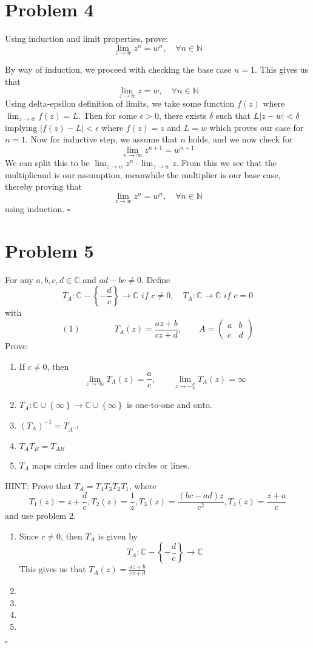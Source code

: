 \documentclass[12pt]{article}
\newcommand{\N}{\mathbb{N}}
\newcommand{\C}{\mathbb{C}}
\newcommand{\set}[1]{\left\{ #1\right\}}
\newenvironment{proof}{\noindent{\bf Proof.}}{\hfill $\square$\medskip}
\begin{document}
\section{Problem 4}
Using induction and limit properties, prove:
$$\lim_{z\to w}z^{n}=w^{n},\quad\forall n\in\N$$

\begin{proof}
By way of induction, we proceed with checking the base case $n=1$. This gives us that
$$\lim_{z\to w}z=w,\quad\forall n\in\N$$
Using delta-epsilon definition of limits, we take some function $f(z)$ where $\lim_{z\to w}f(z)=L$. Then for some $\epsilon>0$, there exists $\delta$ such that $L|z-w|<\delta$ implying $|f(z)-L|<\epsilon$ where $f(z)=z$ and $L=w$ which proves our case for $n=1$. Now for inductive step, we assume that $n$ holds, and we now check for
$$\lim_{n\to\infty}z^{n+1}=w^{n+1}$$
We can split this to be $\lim_{z\to w}z^{n}\cdot \lim_{z\to w}z$. From this we see that the multiplicand is our assumption, meanwhile the multiplier is our base case, thereby proving that
$$\lim_{z\to w}z^{n}=w^{n},\quad\forall n\in\N$$
using induction.
\end{proof}


\newpage
\section{Problem 5}
For any $a,b,c,d\in \C$ and $ad-bc\neq 0$. Define
$$T_{A}:\C-\set{-\frac{d}{c}}\rightarrow\C\textit{ if }c\neq 0,\quad T_{A}:\C\rightarrow\C\textit{ if }c=0$$
with
$$(1)\qquad\qquad T_{A}(z)=\frac{az+b}{cz+d},\qquad A=\begin{pmatrix}a&b\\c&d\end{pmatrix}$$
Prove:
\begin{enumerate}[label=\textbf{(\alph*)}]
    \item If $c\neq 0$, then
    $$\lim_{z\to\infty}T_{A}(z)=\frac{a}{c},\qquad \lim_{z\to-\frac{d}{c}}T_{A}(z)=\infty$$
    \item $T_{A}:\C\cup\set{\infty}\rightarrow\C\cup\set{\infty}$ is one-to-one and onto.
    \item $(T_{A})^{-1}=T_{A^{-1}}$
    \item $T_{A}T_{B}=T_{AB}$
    \item $T_{A}$ maps circles and lines onto circles or lines.
\end{enumerate}
HINT: Prove that $T_{A}=T_{4}T_{3}T_{2}T_{1}$, where
$$T_{1}(z)=z+\frac{d}{c}, T_{2}(z)=\frac{1}{z}, T_{3}(z)=\frac{(bc-ad)z}{c^{2}}, T_{4}(z)=\frac{z+a}{c}$$
and use problem 2.

\begin{proof}
\begin{enumerate}[label=\textbf{(\alph*)}]
    \item Since $c\neq 0$, then $T_{A}$ is given by
    $$T_{A}:\C-\set{-\frac{d}{c}}\rightarrow\C$$
    This gives us that $T_{A}(z)=\frac{az+b}{cz+d}$
    \item
    \item
    \item
    \item
\end{enumerate}
\end{proof}
\end{document}
